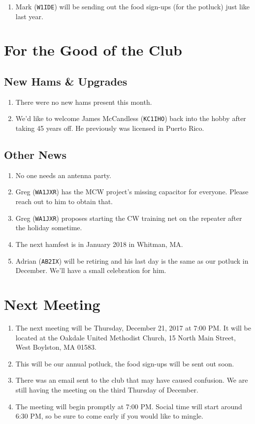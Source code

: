 \documentclass[10pt,letterpaper]{article}
\begin{document}
\begin{enumerate}
  \item Mark (\texttt{W1IDE}) will be sending out the food sign-ups (for the potluck) just like last year.
\end{enumerate}

\section{For the Good of the Club}

\subsection{New Hams \& Upgrades}
\begin{enumerate}
  \item There were no new hams present this month.
  \item We'd like to welcome James McCandless (\texttt{KC1IHO}) back into the hobby after taking 45 years off. He previously was licensed in Puerto Rico.
\end{enumerate}

\subsection{Other News}
\begin{enumerate}
  \item No one needs an antenna party.
  \item Greg (\texttt{WA1JXR}) has the MCW project's missing capacitor for everyone. Please reach out to him to obtain that.
  \item Greg (\texttt{WA1JXR}) proposes starting the CW training net on the repeater after the holiday sometime.
  \item The next hamfest is in January 2018 in Whitman, MA.
  \item Adrian (\texttt{AB2IX}) will be retiring and his last day is the same as our potluck in December. We'll have a small celebration for him.
\end{enumerate}

\section{Next Meeting}
\begin{enumerate}
  \item The next meeting will be Thursday, December 21, 2017 at 7:00 PM. It will be located at the Oakdale United Methodist Church, 15 North Main Street, West Boylston, MA 01583.
  \item This will be our annual potluck, the food sign-ups will be sent out soon.
  \item There was an email sent to the club that may have caused confusion. We are still having the meeting on the third Thursday of December.
  \item The meeting will begin promptly at 7:00 PM. Social time will start around 6:30 PM, so be sure to come early if you would like to mingle.
\end{enumerate}
\end{document}
